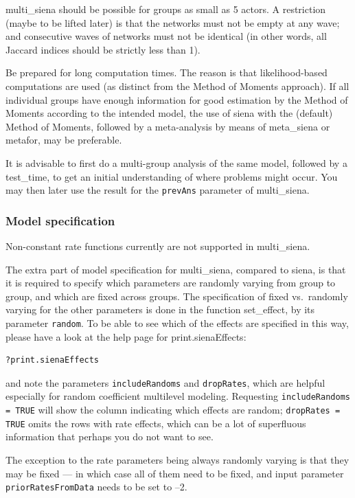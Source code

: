 \documentclass[a4paper,fleqn,11pt]{article}
\newcommand{\+}{\, + \,}
\newcommand{\sfn}[1]{\textsf{#1}}
\begin{document}
\textsf{multi\_siena} should be possible for groups as small as 5 actors.
A restriction (maybe to be lifted later) is that the networks must not be
empty at any wave; and consecutive waves of networks must not be identical
(in other words, all Jaccard indices should be strictly less than 1).

Be prepared for long computation times. The reason is that likelihood-based
computations are used (as distinct from the Method of Moments approach).
If all individual groups have enough information for good estimation by
the Method of Moments according to the intended model,
the use of \sfn{siena} with the (default) Method of Moments, followed by a
meta-analysis by means of \sfn{meta\_siena} or \sfn{metafor}, may be preferable.

It is advisable to first do a multi-group analysis of the same model,
followed by a \textsf{test\_time}, to get an initial understanding of where problems
might occur. You may then later use the result for the \texttt{prevAns}
parameter of \textsf{multi\_siena}.


\subsubsection{Model specification}

Non-constant rate functions currently are not supported in \textsf{multi\_siena}.

The extra part of model specification for \textsf{multi\_siena},
compared to \textsf{siena},
is that it is required to specify which parameters are
randomly varying from group to group, and which are fixed across groups.
The specification of fixed vs.\ randomly varying
for the other parameters is done in the function
\textsf{set\_effect}, by its parameter \texttt{random}.
To be able to see which of the effects are specified in this way,
please have a look at the help page for \sfn{print.sienaEffects}:
\begin{verbatim}
?print.sienaEffects
\end{verbatim}
and note the parameters \texttt{includeRandoms}
and \texttt{dropRates}, which are helpful especially for
random coefficient multilevel modeling.
Requesting \texttt{includeRandoms = TRUE} will show the column indicating
which effects are random; \texttt{dropRates = TRUE} omits the
rows with rate effects, which can be a lot of superfluous information
that perhaps you do not want to see.

The exception to the rate parameters being always randomly varying
is that they may be fixed --- in which case all of them need to be fixed,
and input parameter \\
\texttt{priorRatesFromData} needs to be set to --2.
\medskip
\end{document}

